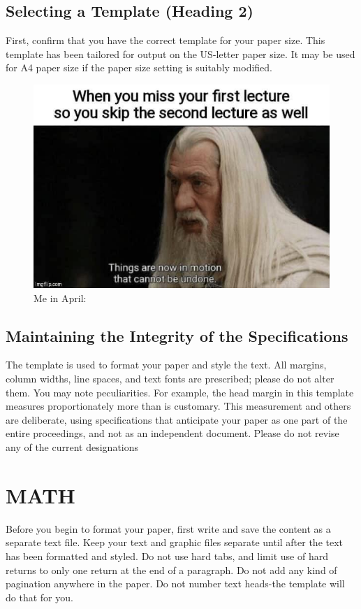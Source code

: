 \documentclass[letterpaper, 10 pt, conference]{ieeeconf}  %
\begin{document}
\subsection{Selecting a Template (Heading 2)}

First, confirm that you have the correct template for your paper size. This template has been tailored for output on the US-letter paper size. 
It may be used for A4 paper size if the paper size setting is suitably modified.

\begin{figure}
        \centering
        \includegraphics[width=0.8\linewidth]{saruman.jpg}
        \caption{Me in April:}
        \label{fig:saruman}
\end{figure}

\subsection{Maintaining the Integrity of the Specifications}

The template is used to format your paper and style the text. All margins, column widths, line spaces, and text fonts are prescribed; please do not alter them. You may note peculiarities. For example, the head margin in this template measures proportionately more than is customary. This measurement and others are deliberate, using specifications that anticipate your paper as one part of the entire proceedings, and not as an independent document. Please do not revise any of the current designations

\section{MATH}

Before you begin to format your paper, first write and save the content as a separate text file. Keep your text and graphic files separate until after the text has been formatted and styled. Do not use hard tabs, and limit use of hard returns to only one return at the end of a paragraph. Do not add any kind of pagination anywhere in the paper. Do not number text heads-the template will do that for you.
\end{document}
